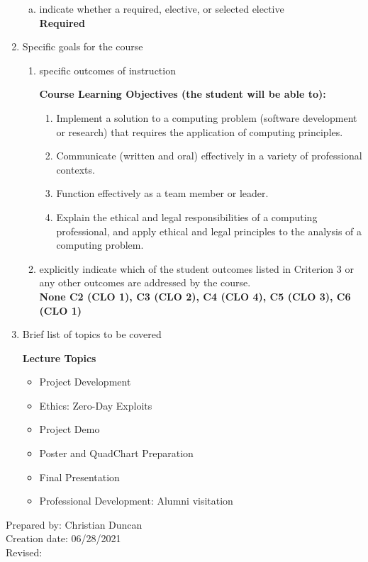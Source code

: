 \begin{enumerate}[1.]
\begin{enumerate}[a.]
\item indicate whether a required, elective, or selected elective\\ %
  {\bfseries
    Required
  }

\end{enumerate}

\item Specific goals for the course
\begin{enumerate}
\item specific outcomes of instruction\\ %
  {\bfseries
    Course Learning Objectives (the student will be able to):
    \begin{enumerate}
    \item Implement a solution to a computing problem (software development or research) that requires the application of computing principles.
    \item Communicate (written and oral) effectively in a variety of professional contexts.
    \item Function effectively as a team member or leader.
    \item Explain the ethical and legal responsibilities of a computing professional, and apply ethical and legal principles to the analysis of a computing problem.
   \end{enumerate}
  }

\item explicitly indicate which of the student outcomes listed in Criterion 3 or any other outcomes are addressed by the course.\\
  {\bfseries
    None
    C2 (CLO 1),
    C3 (CLO 2),
    C4 (CLO 4),
    C5 (CLO 3),
    C6 (CLO 1)
  }
\end{enumerate}

\item Brief list of topics to be covered\\
  {\bfseries
    Lecture Topics
    \begin{itemize}
      \item Project Development
      \item Ethics: Zero-Day Exploits
      \item Project Demo
      \item Poster and QuadChart Preparation
      \item Final Presentation
      \item Professional Development: Alumni visitation
    \end{itemize}
  }

\end{enumerate}

\noindent Prepared by: Christian Duncan\\
\noindent Creation date: 06/28/2021\\
\noindent Revised:\\
